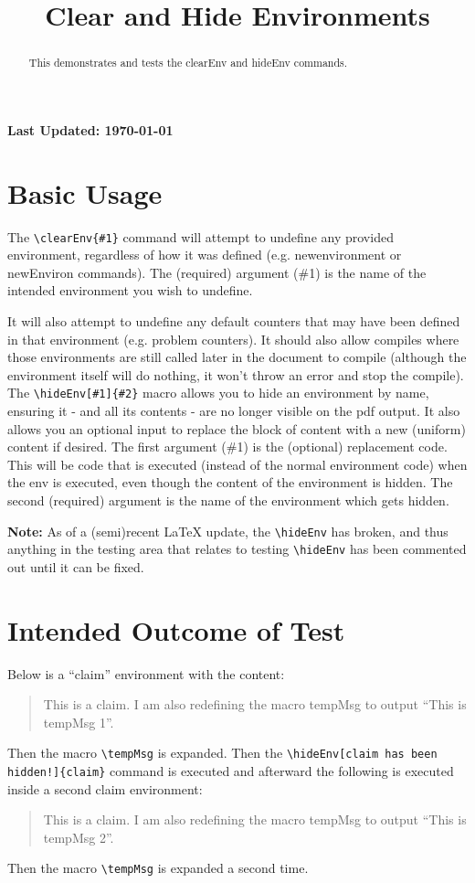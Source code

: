 \documentclass{ximera}
\title{Clear and Hide Environments}
\begin{document}
\begin{abstract}
    This demonstrates and tests the clearEnv and hideEnv commands.    
\end{abstract}
\maketitle

{{\Huge \bfseries Last Updated: \today}} \\



\section{Basic Usage}
The \verb|\clearEnv{#1}| command will attempt to undefine any provided environment, 
regardless of how it was defined (e.g. newenvironment or newEnviron commands).
The (required) argument (\#1) is the name of the intended environment you wish to undefine.

It will also attempt to undefine any default counters that may have been defined in that environment
(e.g. problem counters). It should also allow compiles where those environments are still called later in 
the document to compile (although the environment itself will do nothing, it won't throw an error and stop the compile).\\

The \verb|\hideEnv[#1]{#2}| macro allows you to hide an environment by name, ensuring it - and all its contents - 
are no longer visible on the pdf output. It also allows you an optional input to replace the block of content with 
a new (uniform) content if desired.
The first argument (\#1) is the (optional) replacement code. This will be code that is executed (instead of the normal environment code)
when the env is executed, even though the content of the environment is hidden. The second (required) argument is the name of the environment 
which gets hidden.

\textbf{Note:} As of a (semi)recent LaTeX update, the \verb|\hideEnv| has broken, and thus anything in the testing area that 
relates to testing \verb|\hideEnv| has been commented out until it can be fixed.

\section{Intended Outcome of Test}
\newcommand{\tmpMsg}{}

Below is a ``claim'' environment with the content: 
\begin{quote}
This is a claim. I am also redefining the macro tempMsg to output ``This is tempMsg 1''.
\end{quote}
Then the macro \verb|\tempMsg| is expanded. Then the \verb|\hideEnv[claim has been hidden!]{claim}| command is executed 
and afterward the following is executed inside a second claim environment:
\begin{quote}
This is a claim. I am also redefining the macro tempMsg to output ``This is tempMsg 2''.
\end{quote}
Then the macro \verb|\tempMsg| is expanded a second time.
\end{document}
